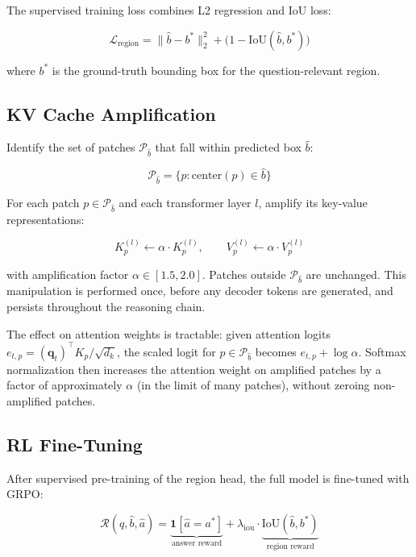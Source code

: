\documentclass[10pt,twocolumn]{article}
\begin{document}
The supervised training loss combines L2 regression and IoU loss:

\begin{equation}
\mathcal{L}_{\mathrm{region}} = \|\hat{b} - b^*\|_2^2 + \bigl(1 - \mathrm{IoU}(\hat{b}, b^*)\bigr)
\end{equation}

where $b^*$ is the ground-truth bounding box for the question-relevant region.

\subsection*{KV Cache Amplification}

Identify the set of patches $\mathcal{P}_{\hat{b}}$ that fall within predicted box $\hat{b}$:

\begin{equation}
\mathcal{P}_{\hat{b}} = \{p : \mathrm{center}(p) \in \hat{b}\}
\end{equation}

For each patch $p \in \mathcal{P}_{\hat{b}}$ and each transformer layer $l$, amplify its key-value representations:

\begin{equation}
K^{(l)}_p \leftarrow \alpha \cdot K^{(l)}_p, \qquad V^{(l)}_p \leftarrow \alpha \cdot V^{(l)}_p
\label{eq:amplify}
\end{equation}

with amplification factor $\alpha \in [1.5, 2.0]$.
Patches outside $\mathcal{P}_{\hat{b}}$ are unchanged.
This manipulation is performed once, before any decoder tokens are generated, and persists throughout the reasoning chain.

The effect on attention weights is tractable:
given attention logits $e_{t,p} = (\mathbf{q}_t)^\top K_p / \sqrt{d_k}$, the scaled logit for $p \in \mathcal{P}_{\hat{b}}$ becomes $e_{t,p} + \log\alpha$.
Softmax normalization then increases the attention weight on amplified patches by a factor of approximately $\alpha$ (in the limit of many patches), without zeroing non-amplified patches.

\subsection*{RL Fine-Tuning}

After supervised pre-training of the region head, the full model is fine-tuned with GRPO:

\begin{equation}
\mathcal{R}(q, \hat{b}, \hat{a}) = \underbrace{\mathbf{1}[\hat{a} = a^*]}_{\text{answer reward}} + \lambda_{\mathrm{iou}} \cdot \underbrace{\mathrm{IoU}(\hat{b}, b^*)}_{\text{region reward}}
\label{eq:rl}
\end{equation}
\end{document}
